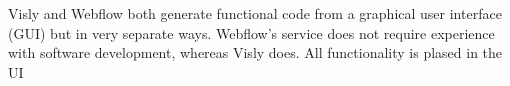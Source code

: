 Visly and Webflow both generate functional code from a graphical user interface (GUI) but in very separate ways. Webflow's service does not require experience with software development, whereas Visly does. All functionality is plased in the UI
